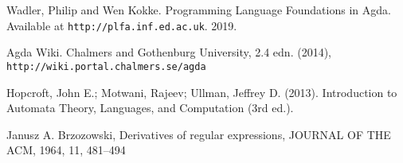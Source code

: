 \begin{thebibliography}{9}

Wadler, Philip and Wen Kokke. Programming Language Foundations in Agda. Available at \texttt{http://plfa.inf.ed.ac.uk}. 2019.

Agda Wiki. Chalmers and Gothenburg University, 2.4 edn. (2014), \texttt{http://wiki.portal.chalmers.se/agda}

Hopcroft, John E.; Motwani, Rajeev; Ullman, Jeffrey D. (2013). Introduction to Automata Theory, Languages, and Computation (3rd ed.). 

Janusz A. Brzozowski, Derivatives of regular expressions, JOURNAL OF THE ACM, 1964, 11, 481--494

\end{thebibliography}